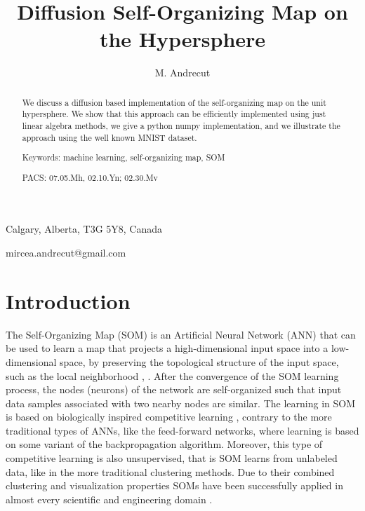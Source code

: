 \documentclass[10pt,english]{article}
\begin{document}

\title{Diffusion Self-Organizing Map on the Hypersphere}

\author{M. Andrecut}


\maketitle
{

\centering Calgary, Alberta, T3G 5Y8, Canada

\centering mircea.andrecut@gmail.com

} 
\bigskip 
\begin{abstract}

We discuss a diffusion based implementation of the self-organizing map on the unit hypersphere. We show that this approach can be efficiently 
implemented using just linear algebra methods, we give a python numpy implementation, and we illustrate the approach using the 
well known MNIST dataset. 

\smallskip 

Keywords: machine learning, self-organizing map, SOM

PACS: 07.05.Mh, 02.10.Yn; 02.30.Mv
\end{abstract}


\section{Introduction}

The Self-Organizing Map (SOM) is an Artificial Neural Network (ANN) that can be used to learn a map that projects a high-dimensional input space 
into a low-dimensional space, by preserving the topological structure of the input space, such as the local neighborhood \cite{key-1}, \cite{key-2}. 
After the convergence of the SOM learning process, the nodes (neurons) of the network are self-organized such that input data samples associated with two nearby nodes are similar. 
The learning in SOM is based on biologically inspired competitive learning  \cite{key-3}, contrary to the more traditional types of ANNs, like the feed-forward networks, 
where learning is based on some variant of the backpropagation algorithm. Moreover, this type of competitive learning is also unsupervised, that is SOM learns from unlabeled data, like 
in the more traditional clustering methods. Due to their combined clustering and visualization properties SOMs have been successfully applied in almost every 
scientific and engineering domain \cite{key-4}. 
\end{document}
